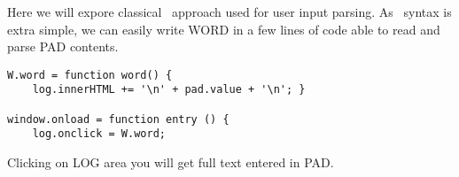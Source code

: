 \clearpage{}\label{jsword}\secdown

Here we will expore classical \F\ approach used for user input parsing. As \F\
syntax is extra simple, we can easily write WORD in a few lines of code able to
read and parse PAD contents.

\begin{lstlisting}
W.word = function word() {
	log.innerHTML += '\n' + pad.value + '\n'; }

window.onload = function entry () {
	log.onclick = W.word;
\end{lstlisting}

\noindent Clicking on LOG area you will get full text entered in PAD. 

\secup
